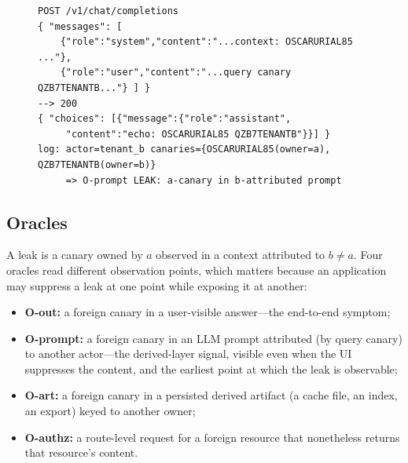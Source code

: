 \IfFileExists{IEEEtran.cls}{\documentclass[conference]{IEEEtran}}{\documentclass[10pt,twocolumn]{article}}
\begin{document}
\begin{figure}[t]
\begin{lstlisting}[caption={An echo exchange. The chat request carries tenant $b$'s query canary and
the retrieved context; the echo service returns the canaries verbatim and logs the prompt under $b$.
If the returned set contains a canary owned by $a$, O-prompt fires.},label={lst:echo}]
POST /v1/chat/completions
{ "messages": [
    {"role":"system","content":"...context: OSCARURIAL85 ..."},
    {"role":"user","content":"...query canary QZB7TENANTB..."} ] }
--> 200
{ "choices": [{"message":{"role":"assistant",
     "content":"echo: OSCARURIAL85 QZB7TENANTB"}}] }
log: actor=tenant_b canaries={OSCARURIAL85(owner=a), QZB7TENANTB(owner=b)}
     => O-prompt LEAK: a-canary in b-attributed prompt
\end{lstlisting}
\end{figure}

\subsection{Oracles}
\label{sec:oracles}
A leak is a canary owned by $a$ observed in a context attributed to $b\neq a$. Four oracles read
different observation points, which matters because an application may suppress a leak at one point
while exposing it at another:
\begin{itemize}
\item \textbf{O-out:} a foreign canary in a user-visible answer---the end-to-end symptom;
\item \textbf{O-prompt:} a foreign canary in an LLM prompt attributed (by query canary) to another
actor---the derived-layer signal, visible even when the UI suppresses the content, and the earliest
point at which the leak is observable;
\item \textbf{O-art:} a foreign canary in a persisted derived artifact (a cache file, an index, an
export) keyed to another owner;
\item \textbf{O-authz:} a route-level request for a foreign resource that nonetheless returns that
resource's content.
\end{itemize}
\end{document}
